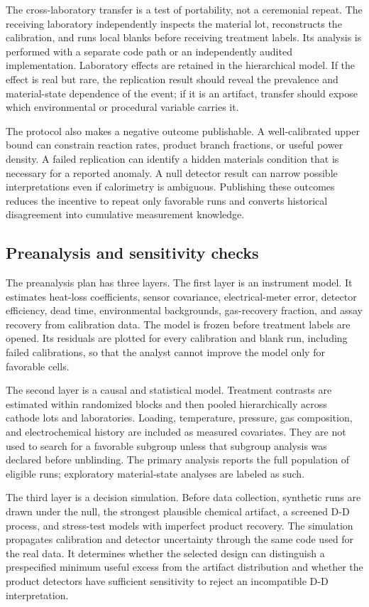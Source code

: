 \documentclass[conference]{IEEEtran}
\begin{document}
The cross-laboratory transfer is a test of portability, not a ceremonial repeat. The receiving laboratory independently inspects the material lot, reconstructs the calibration, and runs local blanks before receiving treatment labels. Its analysis is performed with a separate code path or an independently audited implementation. Laboratory effects are retained in the hierarchical model. If the effect is real but rare, the replication result should reveal the prevalence and material-state dependence of the event; if it is an artifact, transfer should expose which environmental or procedural variable carries it.

The protocol also makes a negative outcome publishable. A well-calibrated upper bound can constrain reaction rates, product branch fractions, or useful power density. A failed replication can identify a hidden materials condition that is necessary for a reported anomaly. A null detector result can narrow possible interpretations even if calorimetry is ambiguous. Publishing these outcomes reduces the incentive to repeat only favorable runs and converts historical disagreement into cumulative measurement knowledge.

\subsection{Preanalysis and sensitivity checks}
The preanalysis plan has three layers. The first layer is an instrument model. It estimates heat-loss coefficients, sensor covariance, electrical-meter error, detector efficiency, dead time, environmental backgrounds, gas-recovery fraction, and assay recovery from calibration data. The model is frozen before treatment labels are opened. Its residuals are plotted for every calibration and blank run, including failed calibrations, so that the analyst cannot improve the model only for favorable cells.

The second layer is a causal and statistical model. Treatment contrasts are estimated within randomized blocks and then pooled hierarchically across cathode lots and laboratories. Loading, temperature, pressure, gas composition, and electrochemical history are included as measured covariates. They are not used to search for a favorable subgroup unless that subgroup analysis was declared before unblinding. The primary analysis reports the full population of eligible runs; exploratory material-state analyses are labeled as such.

The third layer is a decision simulation. Before data collection, synthetic runs are drawn under the null, the strongest plausible chemical artifact, a screened D-D process, and stress-test models with imperfect product recovery. The simulation propagates calibration and detector uncertainty through the same code used for the real data. It determines whether the selected design can distinguish a prespecified minimum useful excess from the artifact distribution and whether the product detectors have sufficient sensitivity to reject an incompatible D-D interpretation.
\end{document}

